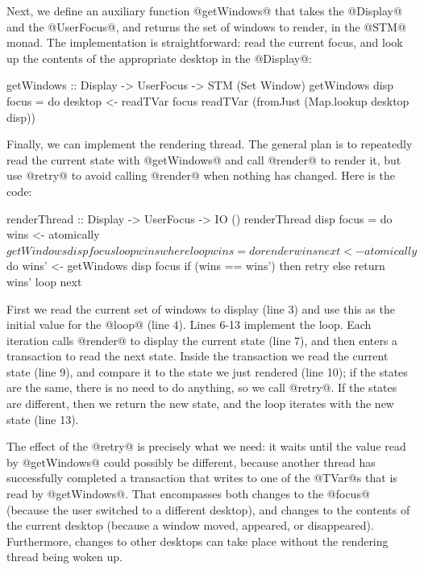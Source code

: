 Next, we define an auxiliary function @getWindows@ that takes the
@Display@ and the @UserFocus@, and returns the set of windows to render,
in the @STM@ monad.  The implementation is straightforward: read the
current focus, and look up the contents of the appropriate desktop in
the @Display@:

\begin{haskell}
getWindows :: Display -> UserFocus -> STM (Set Window)
getWindows disp focus = do
  desktop <- readTVar focus
  readTVar (fromJust (Map.lookup desktop disp))
\end{haskell}

Finally, we can implement the rendering thread.  The general plan is
to repeatedly read the current state with @getWindows@ and call
@render@ to render it, but use @retry@ to avoid calling @render@ when
nothing has changed.  Here is the code:

\begin{numhaskell}
renderThread :: Display -> UserFocus -> IO ()
renderThread disp focus = do
  wins <- atomically $ getWindows disp focus
  loop wins
 where
  loop wins = do
    render wins
    next <- atomically $ do
               wins' <- getWindows disp focus
               if (wins == wins')
                   then retry
                   else return wins'
    loop next
\end{numhaskell}

\noindent First we read the current set of windows to display (line 3)
and use this as the initial value for the @loop@ (line 4).  Lines 6-13
implement the loop.  Each iteration calls @render@ to display the
current state (line 7), and then enters a transaction to read the next
state.  Inside the transaction we read the current state (line 9), and
compare it to the state we just rendered (line 10); if the states are
the same, there is no need to do anything, so we call @retry@.  If the
states are different, then we return the new state, and the loop
iterates with the new state (line 13).

The effect of the @retry@ is precisely what we need: it waits until
the value read by @getWindows@ could possibly be different, because
another thread has successfully completed a transaction that writes to
one of the @TVar@s that is read by @getWindows@.  That encompasses
both changes to the @focus@ (because the user switched to a different
desktop), and changes to the contents of the current desktop (because
a window moved, appeared, or disappeared).  Furthermore, changes to
other desktops can take place without the rendering thread being woken
up.

